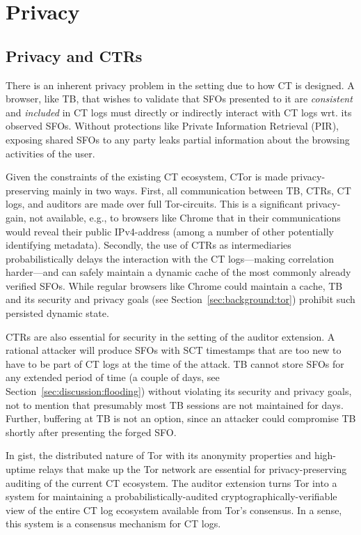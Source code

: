 \section{Privacy} \label{sec:privacy}

\subsection{Privacy and CTRs}
There is an inherent privacy problem in the setting due to how CT is designed. A
browser, like TB, that wishes to validate that SFOs presented to it are
\emph{consistent} and \emph{included} in CT logs must directly or indirectly
interact with CT logs wrt. its observed SFOs. Without protections like Private
Information Retrieval (PIR), exposing shared SFOs to any party leaks partial
information about the browsing activities of the user.

Given the constraints of the existing CT ecosystem, CTor is made
privacy-preserving mainly in two ways. First, all communication between TB,
CTRs, CT logs, and auditors are made over full Tor-circuits. This is a
significant privacy-gain, not available, e.g., to browsers like Chrome that in
their communications would reveal their public IPv4-address (among a number of
other potentially identifying metadata). Secondly, the use of CTRs as
intermediaries probabilistically delays the interaction with the CT
logs---making correlation harder---and can safely maintain a dynamic cache of
the most commonly already verified SFOs. While regular browsers like Chrome
could maintain a cache, TB and its security and privacy goals (see
Section~\ref{sec:background:tor}) prohibit such persisted dynamic state.

CTRs are also essential for security in the setting of the auditor extension. A
rational attacker will produce SFOs with SCT timestamps that are too new to have
to be part of CT logs at the time of the attack. TB cannot store SFOs for any
extended period of time (a couple of days, see
Section~\ref{sec:discussion:flooding}) without violating its security and
privacy goals, not to mention that presumably most TB sessions are not
maintained for days. Further, buffering at TB is not an option, since an
attacker could compromise TB shortly after presenting the forged SFO.

In gist, the distributed nature of Tor with its anonymity properties and
high-uptime relays that make up the Tor network are essential for
privacy-preserving auditing of the current CT ecosystem. The auditor extension
turns Tor into a system for maintaining a probabilistically-audited
cryptographically-verifiable view of the entire CT log ecosystem available from
Tor’s consensus. In a sense, this system is a consensus mechanism for CT logs.

